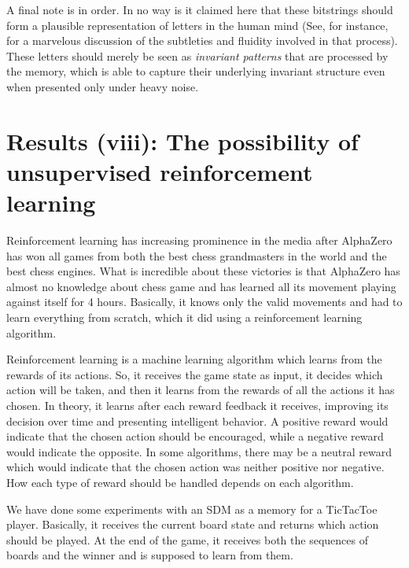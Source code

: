 A final note is in order.  In no way is it claimed here that these bitstrings should form a plausible representation of letters in the human mind (See, for instance, \citet{hofstadter1995seeing} for a marvelous discussion of the subtleties and fluidity involved in that process).  These letters should merely be seen as \emph{invariant patterns} that are processed by the memory, which is able to capture their underlying invariant structure even when presented only under heavy noise.












\chapter{Results (viii): The possibility of unsupervised reinforcement learning}

Reinforcement learning has increasing prominence in the media after AlphaZero has won all games from both the best chess grandmasters in the world and the best chess engines. What is incredible about these victories is that AlphaZero has almost no knowledge about chess game and has learned all its movement playing against itself for 4 hours. Basically, it knows only the valid movements and had to learn everything from scratch, which it did using a reinforcement learning algorithm.

Reinforcement learning is a machine learning algorithm which learns from the rewards of its actions. So, it receives the game state as input, it decides which action will be taken, and then it learns from the rewards of all the actions it has chosen. In theory, it learns after each reward feedback it receives, improving its decision over time and presenting intelligent behavior. A positive reward would indicate that the chosen action should be encouraged, while a negative reward would indicate the opposite. In some algorithms, there may be a neutral reward which would indicate that the chosen action was neither positive nor negative. How each type of reward should be handled depends on each algorithm.

We have done some experiments with an SDM as a memory for a TicTacToe player. Basically, it receives the current board state and returns which action should be played. At the end of the game, it receives both the sequences of boards and the winner and is supposed to learn from them.

